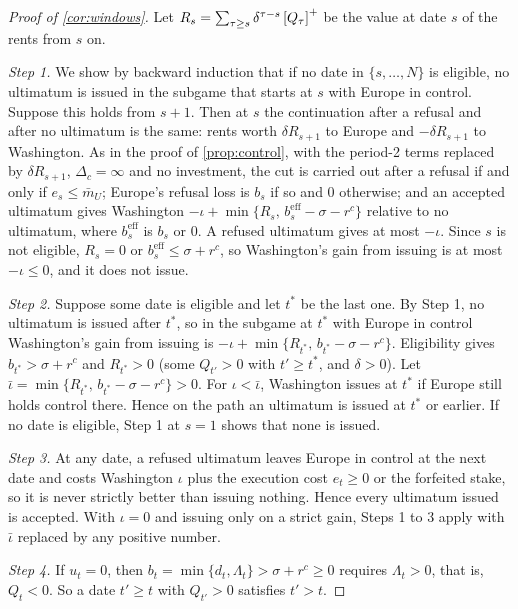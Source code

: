 \begin{proof}[Proof of \cref{cor:windows}]
Let $R_s=\sum_{\tau\ge s}\delta^{\tau-s}\left[Q_\tau\right]^{+}$ be the value at date $s$ of the rents from $s$ on.

\emph{Step 1.} We show by backward induction that if no date in $\{s,\dots,N\}$ is eligible, no ultimatum is issued in the subgame that starts at $s$ with Europe in control. Suppose this holds from $s+1$. Then at $s$ the continuation after a refusal and after no ultimatum is the same: rents worth $\delta R_{s+1}$ to Europe and $-\delta R_{s+1}$ to Washington. As in the proof of \cref{prop:control}, with the period-2 terms replaced by $\delta R_{s+1}$, $\Delta_c=\infty$ and no investment, the cut is carried out after a refusal if and only if $e_s\le\bar m_U$; Europe's refusal loss is $b_s$ if so and $0$ otherwise; and an accepted ultimatum gives Washington $-\iota+\min\{R_s,\,b^{\mathrm{eff}}_s-\sigma-r^c\}$ relative to no ultimatum, where $b^{\mathrm{eff}}_s$ is $b_s$ or $0$. A refused ultimatum gives at most $-\iota$. Since $s$ is not eligible, $R_s=0$ or $b^{\mathrm{eff}}_s\le\sigma+r^c$, so Washington's gain from issuing is at most $-\iota\le 0$, and it does not issue.

\emph{Step 2.} Suppose some date is eligible and let $t^*$ be the last one. By Step 1, no ultimatum is issued after $t^*$, so in the subgame at $t^*$ with Europe in control Washington's gain from issuing is $-\iota+\min\{R_{t^*},\,b_{t^*}-\sigma-r^c\}$. Eligibility gives $b_{t^*}>\sigma+r^c$ and $R_{t^*}>0$ (some $Q_{t'}>0$ with $t'\ge t^*$, and $\delta>0$). Let $\bar\iota=\min\{R_{t^*},\,b_{t^*}-\sigma-r^c\}>0$. For $\iota<\bar\iota$, Washington issues at $t^*$ if Europe still holds control there. Hence on the path an ultimatum is issued at $t^*$ or earlier. If no date is eligible, Step 1 at $s=1$ shows that none is issued.

\emph{Step 3.} At any date, a refused ultimatum leaves Europe in control at the next date and costs Washington $\iota$ plus the execution cost $e_t\ge 0$ or the forfeited stake, so it is never strictly better than issuing nothing. Hence every ultimatum issued is accepted. With $\iota=0$ and issuing only on a strict gain, Steps 1 to 3 apply with $\bar\iota$ replaced by any positive number.

\emph{Step 4.} If $u_t=0$, then $b_t=\min\{d_t,\Lambda_t\}>\sigma+r^c\ge 0$ requires $\Lambda_t>0$, that is, $Q_t<0$. So a date $t'\ge t$ with $Q_{t'}>0$ satisfies $t'>t$.
\end{proof}

